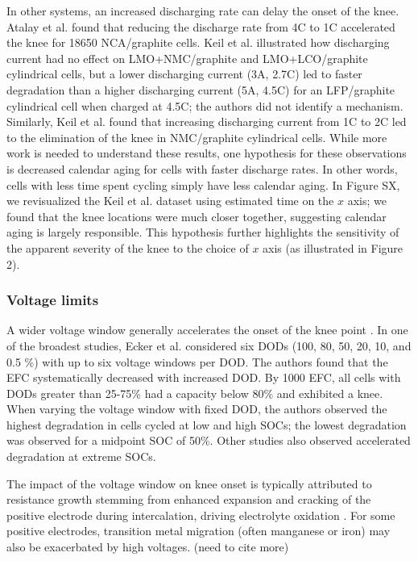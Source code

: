 \documentclass[journal=jpclcd,manuscript=article]{achemso}
\begin{document}
In other systems, an increased discharging rate can delay the onset of the knee.
Atalay et al.\cite{atalay_theory_2020} found that reducing the discharge rate from 4C to 1C accelerated the knee for 18650 NCA/graphite cells.
Keil et al.\cite{keil_charging_2016} illustrated how discharging current had no effect on LMO+NMC/graphite and LMO+LCO/graphite cylindrical cells, but a lower discharging current (3A, 2.7C) led to faster degradation than a higher discharging current (5A, 4.5C) for an LFP/graphite cylindrical cell when charged at 4.5C; the authors did not identify a mechanism. 
Similarly, Keil et al.\cite{keil_linear_2019} found that increasing discharging current from 1C to 2C led to the elimination of the knee in NMC/graphite cylindrical cells.
While more work is needed to understand these results, one hypothesis for these observations is decreased calendar aging for cells with faster discharge rates.
In other words, cells with less time spent cycling simply have less calendar aging. In Figure SX, we revisualized the Keil et al.\cite{keil_linear_2019} dataset using estimated time on the $x$ axis; we found that the knee locations were much closer together, suggesting calendar aging is largely responsible. This hypothesis further highlights the sensitivity of the apparent severity of the knee to the choice of $x$ axis (as illustrated in Figure 2).

\subsubsection{Voltage limits} 
A wider voltage window generally accelerates the onset of the knee point \cite{ecker_calendar_2014, pfrang_long-term_2018, klett_non-uniform_2014, ma_novel_2019, petzl_lithium_2015, schuster_nonlinear_2015}. In one of the broadest studies, Ecker et al. \cite{ecker_calendar_2014} considered six DODs (100, 80, 50, 20, 10, and 0.5 \%) with up to six voltage windows per DOD. The authors found that the EFC systematically decreased with increased DOD. By 1000 EFC, all cells with DODs greater than 25-75\% had a capacity below 80\% and exhibited a knee. When varying the voltage window with fixed DOD, the authors observed the highest degradation in cells cycled at low and high SOCs; the lowest degradation was observed for a midpoint SOC of 50\%. Other studies also observed accelerated degradation at extreme SOCs. \cite{aiken_accelerated_2020,ma_novel_2019, zhu_investigation_2021}

The impact of the voltage window on knee onset is typically attributed to resistance growth stemming from enhanced expansion and cracking of the positive electrode during intercalation, driving electrolyte oxidation \cite{aiken_accelerated_2020}. For some positive electrodes, transition metal migration (often manganese or iron) may also be exacerbated by high voltages. \cite{ma_novel_2019} (need to cite more)
\end{document}
